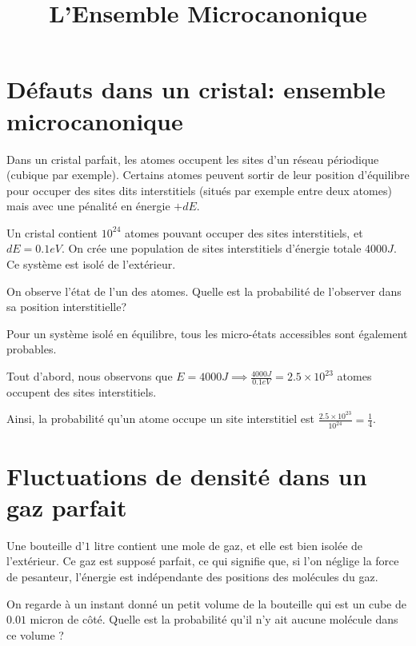 \documentclass[french]{article}
\begin{document}
	\title{L'Ensemble Microcanonique}
	\author{}
	\date{}
	
	\maketitle
	
	\section{Défauts dans un cristal: ensemble microcanonique}
	\begin{tcolorbox}[colback=blue!5!white,colframe=blue!75!black]
		\quad Dans un cristal parfait, les atomes occupent les sites d’un réseau périodique (cubique par exemple). Certains atomes peuvent sortir de leur position d’équilibre pour occuper des sites dits interstitiels (situés par exemple entre deux atomes) mais avec une pénalité en énergie $+dE$.
		
		\quad Un cristal contient $10^{24}$ atomes pouvant occuper des sites interstitiels, et $dE=0.1eV$. On crée une population de sites interstitiels d’énergie totale $4000J$. Ce système est isolé de l’extérieur.
		
		\quad On observe l’état de l’un des atomes. Quelle est la probabilité de l’observer dans sa position interstitielle?
	\end{tcolorbox}

	Pour un système isolé en équilibre, tous les micro-états accessibles sont également probables.
	
	Tout d'abord, nous observons que $E = 4000 J \implies \frac{4000 J}{0.1 eV} = 2.5 \times 10^{23}$ atomes occupent des sites interstitiels.
	
	Ainsi, la probabilité qu'un atome occupe un site interstitiel est \(\frac{2.5 \times 10^{23}}{10^{24}} = \frac{1}{4}\).

	\section{Fluctuations de densité dans un gaz parfait}
	\begin{tcolorbox}[colback=blue!5!white,colframe=blue!75!black]
		\quad Une bouteille d’$1$ litre contient une mole de gaz, et elle est bien isolée de l’extérieur. Ce gaz est supposé parfait, ce qui signifie que, si l’on néglige la force de pesanteur, l’énergie est indépendante des positions des molécules du gaz.
		
		\quad On regarde à un instant donné un petit volume de la bouteille qui est un cube de $0.01$ micron de côté. Quelle est la probabilité qu’il n’y ait aucune molécule dans ce volume ?
	\end{tcolorbox}
\end{document}
